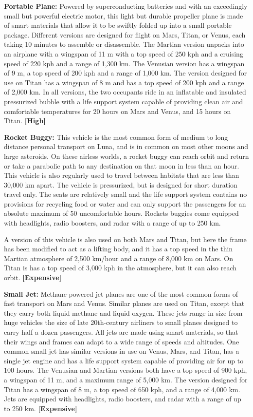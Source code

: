 \textbf{Portable Plane:} Powered by superconducting batteries and with an exceedingly small but powerful electric motor, this light but durable propeller plane is made of smart materials that allow it to be swiftly folded up into a small portable package. Different versions are designed for flight on Mars, Titan, or Venus, each taking 10 minutes to assemble or disassemble. The Martian version unpacks into an airplane with a wingspan of 11 m with a top speed of 250 kph and a cruising speed of 220 kph and a range of 1,300 km. The Venusian version has a wingspan of 9 m, a top speed of 200 kph and a range of 1,000 km. The version designed for use on Titan has a wingspan of 8 m and has a top speed of 200 kph and a range of 2,000 km. In all versions, the two occupants ride in an inflatable and insulated pressurized bubble with a life support system capable of providing clean air and comfortable temperatures for 20 hours on Mars and Venus, and 15 hours on Titan. \textbf{[High]} 

\textbf{Rocket Buggy:} This vehicle is the most common form of medium to long distance personal transport on Luna, and is in common on most other moons and large asteroids. On these airless worlds, a rocket buggy can reach orbit and return or take a parabolic path to any destination on that moon in less than an hour. This vehicle is also regularly used to travel between habitats that are less than 30,000 km apart. The vehicle is pressurized, but is designed for short duration travel only. The seats are relatively small and the life support system contains no provisions for recycling food or water and can only support the passengers for an absolute maximum of 50 uncomfortable hours. Rockets buggies come equipped with headlights, radio boosters, and radar with a range of up to 250 km. 

A version of this vehicle is also used on both Mars and Titan, but here the frame has been modified to act as a lifting body, and it has a top speed in the thin Martian atmosphere of 2,500 km/hour and a range of 8,000 km on Mars. On Titan is has a top speed of 3,000 kph in the atmosphere, but it can also reach orbit. \textbf{[Expensive]} 

\textbf{Small Jet:} Methane-powered jet planes are one of the most common forms of fast transport on Mars and Venus. Similar planes are used on Titan, except that they carry both liquid methane and liquid oxygen. These jets range in size from huge vehicles the size of late 20th-century airliners to small planes designed to carry half a dozen passengers. All jets are made using smart materials, so that their wings and frames can adapt to a wide range of speeds and altitudes. One common small jet has similar versions in use on Venus, Mars, and Titan, has a single jet engine and has a life support system capable of providing air for up to 100 hours. The Venusian and Martian versions both have a top speed of 900 kph, a wingspan of 11 m, and a maximum range of 5,000 km. The version designed for Titan has a wingspan of 8 m, a top speed of 650 kph, and a range of 4,000 km. Jets are equipped with headlights, radio boosters, and radar with a range of up to 250 km. \textbf{[Expensive]} 

